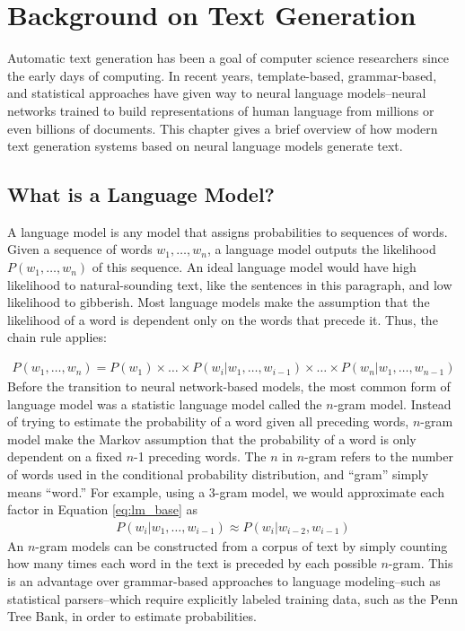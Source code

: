 \chapter{Background on Text Generation}
\label{chap:background}
Automatic text generation has been a goal of computer science researchers since the early days of computing.
In recent years, template-based, grammar-based, and statistical approaches have given way to neural language models--neural networks trained to build representations of human language from millions or even billions of documents.
This chapter gives a brief overview of how modern text generation systems based on neural language models generate text.

\section{What is a Language Model?}
A language model is any model that assigns probabilities to sequences of words.
Given a sequence of words $w_1, \ldots, w_n$, a language model outputs the likelihood $P(w_1, \ldots, w_n)$ of this sequence.
An ideal language model would have high likelihood to natural-sounding text, like the sentences in this paragraph, and  low likelihood to gibberish.
Most language models make the assumption that the likelihood of a word is dependent only on the words that precede it.
Thus, the chain rule applies:

\begin{align}
    \label{eq:lm_base}
    P(w_1, \ldots, w_n) = P(w_1) \times \ldots \times P(w_i | w_1, \ldots, w_{i-1}) \times \ldots \times P(w_n | w_1, \ldots, w_{n-1})
\end{align}
Before the transition to neural network-based models, the most common form of language model was a statistic language model called the $n$-gram model.
Instead of trying to estimate the probability of a word given all preceding words, $n$-gram model make the Markov assumption that the probability of a word is only dependent on a fixed $n$-1 preceding words. The $n$ in $n$-gram refers to the number of words used in the conditional probability distribution, and ``gram'' simply means ``word.''
For example, using a 3-gram model, we would approximate each factor in Equation \ref{eq:lm_base} as
\begin{align}
   P(w_i | w_1, \ldots, w_{i-1}) \approx P(w_i | w_{i-2}, w_{i-1})
\end{align}
An $n$-gram models can be constructed from a corpus of text by simply counting how many times each word in the text is preceded by each possible $n$-gram.
This is an advantage over grammar-based approaches to language modeling--such as statistical parsers--which require explicitly labeled training data, such as the Penn Tree Bank, in order to estimate probabilities.

